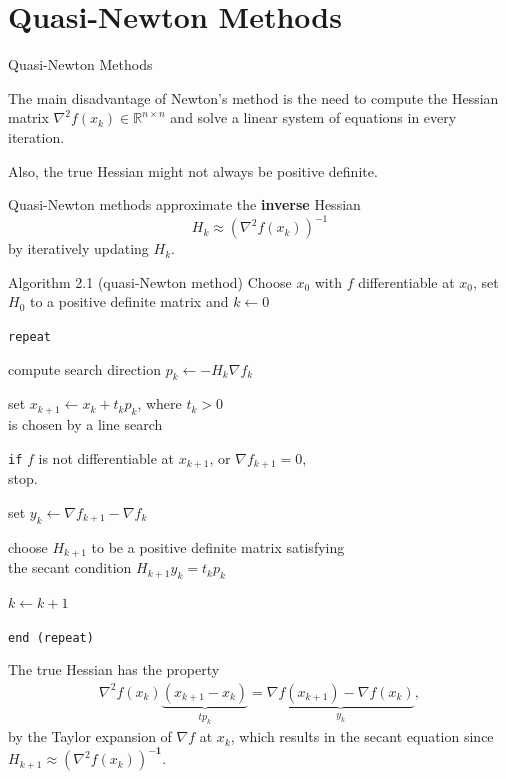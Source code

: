 \documentclass{beamer}
\begin{document}
\section{Quasi-Newton Methods}
\begin{frame}{Quasi-Newton Methods}
     {
        The main disadvantage of Newton's method
        is the need to compute
        the Hessian matrix $\nabla^2 f(x_k) \in \mathbb{R}^{n \times n}$
        and solve a linear system of equations
        in every iteration.

        \vspace{0.5em}
        Also, the true Hessian might not always be positive definite.
    }

     {
        Quasi-Newton methods approximate the
        \textbf{inverse} Hessian
        $$H_k \approx (\nabla^2 f(x_k))^{-1}$$
        by iteratively updating $H_k$.
    }

     {
        \begin{block}{Algorithm 2.1 (quasi-Newton method)}
            Choose $x_0$ with $f$ differentiable at $x_0$,
            set $H_0$ to a positive definite matrix and
            $k \leftarrow 0$

            \texttt{repeat}

            \qquad compute search direction $p_k \leftarrow -H_k \nabla f_k$

            \qquad set $x_{k + 1} \leftarrow x_k + t_k p_k$,
            where $t_k > 0$ \\
            \qquad\qquad is chosen by a line search

            \qquad \texttt{if} $f$ is not differentiable at $x_{k + 1}$,
            or $\nabla f_{k + 1} = 0$, \\
            \qquad\qquad stop.

            \qquad set $y_k \leftarrow \nabla f_{k + 1} - \nabla f_k$

            \qquad choose $H_{k + 1}$ to be a positive definite matrix
            satisfying \\
            \qquad\qquad the secant condition $H_{k + 1} y_k = t_k p_k$

            \qquad $k \leftarrow k + 1$

            \texttt{end (repeat)}
        \end{block}
    }

     {
        The true Hessian has the property
        \begin{align*}
            \nabla^2 f(x_{k}) \underbrace{
                (x_{k + 1} - x_k)
            }_{t p_k} =
            \underbrace{
                \nabla f(x_{k + 1}) - \nabla f(x_k)
            }_{y_k},
        \end{align*}
        by the Taylor expansion of $\nabla f$ at $x_k$,
        which results in the secant equation since
        $H_{k + 1} \approx (\nabla^2 f(x_k))^{\mathbf{-1}}$.
    }


\end{frame}
\end{document}
